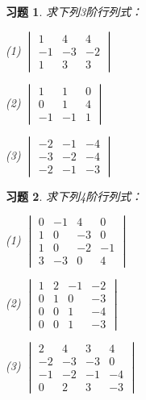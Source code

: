\documentclass[a4paper]{book}
\newtheorem{ex}{习题}[chapter]
\newcommand{\enum}{\begin{list}{}{\setlength{\leftmargin}{0pt} \setlength{\itemindent}{2.5em} \setlength{\listparindent}{2em}}}
\begin{document}
\begin{ex} \label{ex:2.8}
求下列3阶行列式：

\enum
\item[(1)] $\begin{vmatrix} 1 & 4 & 4 \\ -1 & -3 & -2 \\ 1 & 3 & 3 \end{vmatrix}$
\item[(2)] $\begin{vmatrix} 1 & 1 & 0 \\ 0 & 1 & 4 \\ -1 & -1 & 1 \end{vmatrix}$
\item[(3)] $\begin{vmatrix} -2 & -1 & -4 \\ -3 & -2 & -4 \\ -2 & -1 & -3 \end{vmatrix}$
\end{list}
\end{ex}

\begin{ex} \label{ex:2.9}
求下列4阶行列式：

\enum
\item[(1)] $\begin{vmatrix} 0 & -1 & 4 & 0 \\ 1 & 0 & -3 & 0 \\ 1 & 0 & -2 & -1 \\ 3 & -3 & 0 & 4 \end{vmatrix}$
\item[(2)] $\begin{vmatrix} 1 & 2 & -1 & -2 \\ 0 & 1 & 0 & -3 \\ 0 & 0 & 1 & -4 \\ 0 & 0 & 1 & -3 \end{vmatrix}$
\item[(3)] $\begin{vmatrix} 2 & 4 & 3 & 4 \\ -2 & -3 & -3 & 0 \\ -1 & -2 & -1 & -4 \\ 0 & 2 & 3 & -3 \end{vmatrix}$
\end{list}
\end{ex}
\end{document}
